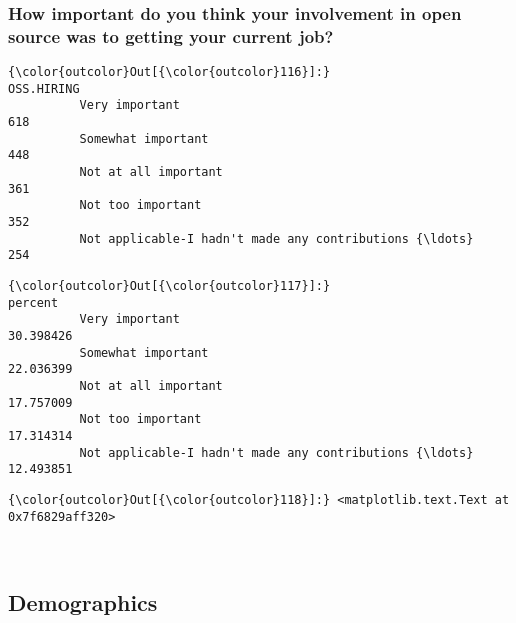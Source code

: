 \documentclass[11pt]{article}
\begin{document}
    \subsubsection{How important do you think your involvement in open
source was to getting your current
job?}\label{how-important-do-you-think-your-involvement-in-open-source-was-to-getting-your-current-job}


            \begin{Verbatim}[commandchars=\\\{\}]
{\color{outcolor}Out[{\color{outcolor}116}]:}                                                     OSS.HIRING
          Very important                                             618
          Somewhat important                                         448
          Not at all important                                       361
          Not too important                                          352
          Not applicable-I hadn't made any contributions {\ldots}         254
\end{Verbatim}
        

            \begin{Verbatim}[commandchars=\\\{\}]
{\color{outcolor}Out[{\color{outcolor}117}]:}                                                       percent
          Very important                                      30.398426
          Somewhat important                                  22.036399
          Not at all important                                17.757009
          Not too important                                   17.314314
          Not applicable-I hadn't made any contributions {\ldots}  12.493851
\end{Verbatim}
        

            \begin{Verbatim}[commandchars=\\\{\}]
{\color{outcolor}Out[{\color{outcolor}118}]:} <matplotlib.text.Text at 0x7f6829aff320>
\end{Verbatim}
        
    \begin{center}
    \end{center}
    { \hspace*{\fill} \\}
    
    \subsection{Demographics}\label{demographics}
\end{document}
